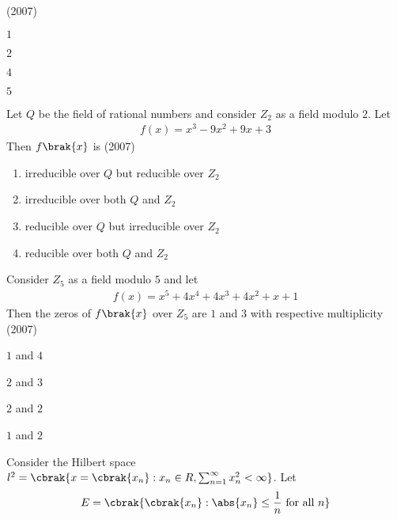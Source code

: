	\hfill{(2007)}
		\begin{enumerate}
             \begin{multicols}{4}  
		       \item $1$
		       \item $2$
		       \item $4$
		       \item $5$
             \end{multicols}
        	\end{enumerate}	
	\item Let $Q$ be the field of rational numbers and consider $Z_{2}$ as a field modulo $2$. Let
             \begin{align*}
		f(x)=x^{3}-9 x^{2}+9 x+3
             \end{align*}
		Then $f\brak{x}$ is
		\hfill{(2007)}
		\begin{enumerate}
			\item irreducible over $Q$ but reducible over $Z_{2}$
            \item irreducible over both $Q$ and $Z_{2}$
            \item reducible over $Q$ but irreducible over $Z_{2}$
            \item reducible over both $Q$ and $Z_{2}$
        	\end{enumerate}	
	\item  Consider $Z_{5}$ as a field modulo $5$ and let
           \begin{align*}
		f(x)=x^{5}+4 x^{4}+4 x^{3}+4 x^{2}+x+1
             \end{align*}
	     Then the zeros of $f\brak{x}$ over $Z_{5}$ are $1$ and $3$ with respective multiplicity
	     \hfill{(2007)}
		\begin{enumerate}
            \begin{multicols}{2}
			\item $1$ and $4$
			\item $2 $ and $3$
			\item $2$ and $2$
			\item $1$ and $2$
   \end{multicols}
        	\end{enumerate}	
	\item Consider the Hilbert space $l^{2}=\cbrak{x=\cbrak{x_{n}}: x_{n} \in R, \sum_{n=1}^{\infty} x_{n}^{2}<\infty}$. Let
             \begin{align*}
		E=\cbrak{\cbrak{x_{n}}:\abs{x_{n}}\leq \frac{1}{n} \text { for all } n}
             \end{align*}
